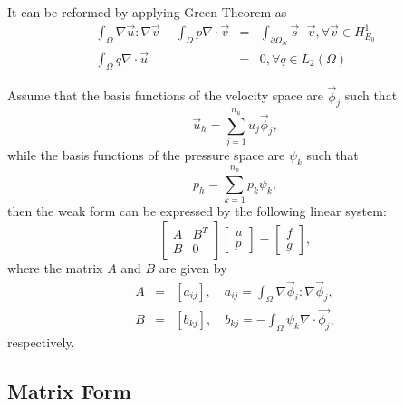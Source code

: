 \documentclass[a4paper]{article}
\begin{document}
It can be reformed by applying Green Theorem as
\begin{equation}
\begin{array}{rcl}
\int_\Omega \nabla \vec{u} : \nabla \vec{v} - \int_\Omega p\nabla
\cdot \vec{v} &=& \int_{\partial \Omega_N}\vec{s}\cdot \vec{v},
\forall \vec{v} \in H^1_{E_0}\\ \int_\Omega q\nabla \cdot \vec{u}
&=& 0, \forall q \in L_2(\Omega)
\label{eq::Stokes}
\end{array}
\end{equation}

Assume that the basis functions of the velocity space are
{$\vec{\phi}_j$} such that
\begin{equation}
\vec{u}_h = \sum^{n_u}_{j=1}u_j\vec{\phi}_j,
\label{eq::Stokes-u}
\end{equation}
while the basis functions of the pressure space are $\psi_k$ such that
\begin{equation}
p_h = \sum^{n_p}_{k=1}p_k\psi_k,
\label{eq::Stokes-p}
\end{equation}
then the weak form can be expressed by the following linear system:
\begin{equation}
\left[ \begin{array}{ccc}
A & B^T \\
B & 0
\end{array}
\right]
\left[\begin{array}{ccc}
u\\
p
\end{array}
\right]=
\left[\begin{array}{ccc}
f\\
g
\end{array}
\right],
\label{mt::Stokes}
\end{equation}
where the matrix $A$ and $B$ are given by
\begin{equation}
\begin{array}{rcl}
A &=& [a_{ij}], \quad a_{ij} = \int_{\Omega} \nabla \vec{\phi}_i :
\nabla \vec{\phi}_j,\\ B &=& [b_{kj}], \quad b_{kj} = -\int_{\Omega}
\psi_k\nabla \cdot \vec{\phi_j},
\end{array}
\end{equation}
respectively.


\subsection{Matrix Form}
\end{document}

